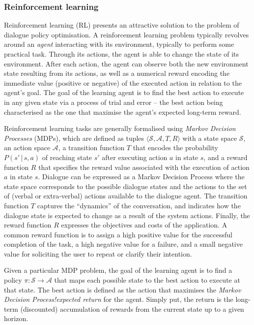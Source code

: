 \subsubsection*{Reinforcement learning}

Reinforcement learning (RL) presents an attractive solution to the problem of dialogue policy optimisation.  A reinforcement learning problem typically revolves around an \textit{agent} interacting with its environment, typically to perform some practical task.  Through its actions, the agent is able to change the state of its environment.  After each action, the agent can observe both the new environment state resulting from its actions, as well as a numerical reward encoding the immediate value (positive or negative) of the executed action in relation to the agent's goal. The goal of the learning agent is to find the best action to execute in any given state via a process of trial and error  -- the best action being characterised as the one that maximise the agent's expected long-term reward.  

Reinforcement learning tasks are generally formalised using \textit{Markov Decision Processes} (MDPs), which are defined as tuples $\langle \mathcal{S}, \mathcal{A}, T, R \rangle$ with a state space $\mathcal{S}$, an action space $\mathcal{A}$, a transition function $T$ that encodes  the probability $P(s'\, | \, s,a)$ of reaching state $s'$ after executing action $a$ in state $s$, and a reward function $R$ that specifies the reward value associated with the execution of action $a$ in state $s$. Dialogue can be expressed as a Markov Decision Process where the state space corresponds to the possible dialogue states and the actions to the set of (verbal or extra-verbal) actions available to the dialogue agent.  The transition function $T$ captures the ``dynamics'' of the conversation, and indicates how the dialogue state is expected to change as a result of the system actions. Finally, the reward function $R$ expresses the objectives and costs of the application. A common reward function is to assign a high positive value for the successful completion of the task, a high negative value for a failure, and a small negative value for soliciting the user to repeat or clarify their intention.  

Given a particular MDP problem, the goal of the learning agent is to find a policy $\pi: \mathcal{S} \rightarrow \mathcal{A}$ that maps each possible state to the best action to execute at that state.  The best action is defined as the action that maximises the \textit{Markov Decision Process!expected return} for the agent.  Simply put, the return is the long-term (discounted) accumulation of rewards from the current state up to a given horizon. 

